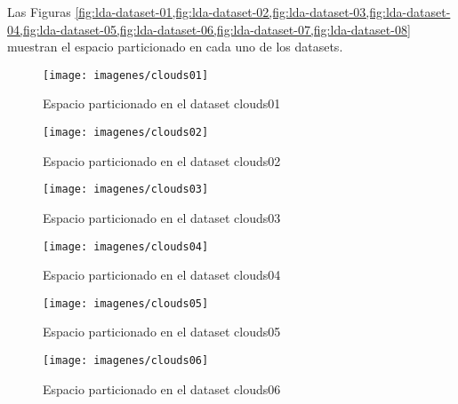 \documentclass[journal]{IEEEtran}
\begin{document}
Las Figuras \cref{fig:lda-dataset-01,fig:lda-dataset-02,fig:lda-dataset-03,fig:lda-dataset-04,fig:lda-dataset-05,fig:lda-dataset-06,fig:lda-dataset-07,fig:lda-dataset-08} muestran el espacio particionado en cada uno de los datasets.
\begin{figure}[tb]
	\begin{center}
		\texttt{[image: imagenes/clouds01]}
	\end{center}
	\caption{Espacio particionado en el dataset clouds01}
	\label{fig:lda-dataset-01}
\end{figure}

\begin{figure}[tb]
	\begin{center}
		\texttt{[image: imagenes/clouds02]}
	\end{center}
	\caption{Espacio particionado en el dataset clouds02}
	\label{fig:lda-dataset-02}
\end{figure}

\begin{figure}[tb]
	\begin{center}
		\texttt{[image: imagenes/clouds03]}
	\end{center}
	\caption{Espacio particionado en el dataset clouds03}
	\label{fig:lda-dataset-03}
\end{figure}

\begin{figure}[tb]
	\begin{center}
		\texttt{[image: imagenes/clouds04]}
	\end{center}
	\caption{Espacio particionado en el dataset clouds04}
	\label{fig:lda-dataset-04}
\end{figure}

\begin{figure}[tb]
	\begin{center}
		\texttt{[image: imagenes/clouds05]}
	\end{center}
	\caption{Espacio particionado en el dataset clouds05}
	\label{fig:lda-dataset-05}
\end{figure}

\begin{figure}[tb]
	\begin{center}
		\texttt{[image: imagenes/clouds06]}
	\end{center}
	\caption{Espacio particionado en el dataset clouds06}
	\label{fig:lda-dataset-06}
\end{figure}
\end{document}
